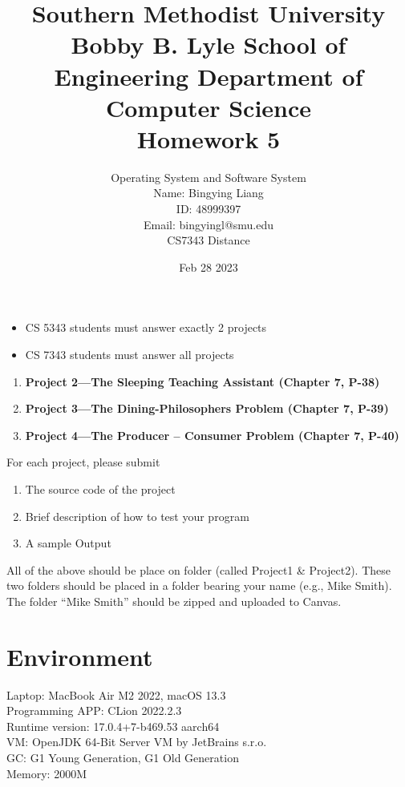 \documentclass[12pt]{article}
\title{Southern Methodist University \\
Bobby B. Lyle School of Engineering Department of Computer Science \\
Homework 5
}
\author{Operating System and Software System \\
Name: Bingying Liang 
\\ ID: 48999397\\ 
Email: bingyingl@smu.edu \\ 
CS7343 Distance}
\date{Feb 28 2023}
\begin{document}
\maketitle
\begin{itemize}
    \item CS 5343 students must answer exactly 2 projects
    \item CS 7343 students must answer all projects
\end{itemize}
    \begin{enumerate}
        \item \textbf{Project 2—The Sleeping Teaching Assistant (Chapter 7, P-38)}
        \item \textbf{Project 3—The Dining-Philosophers Problem (Chapter 7, P-39) }
        \item \textbf{Project 4—The Producer – Consumer Problem (Chapter 7, P-40)}
    \end{enumerate}
    For each project, please submit 
    \begin{enumerate}
        \item The source code of the project
        \item Brief description of how to test your program
        \item A sample Output
    \end{enumerate}
    All of the above should be place on folder (called Project1 \& Project2). These two folders should be placed in a folder bearing your name (e.g., Mike Smith). The folder “Mike Smith” should be zipped and uploaded to Canvas. 
    
    \newpage
    \section*{Environment}
    Laptop: MacBook Air M2 2022, macOS 13.3\\
    
    Programming APP: CLion 2022.2.3 \\
    
    Runtime version: 17.0.4+7-b469.53 aarch64\\
    
    VM: OpenJDK 64-Bit Server VM by JetBrains s.r.o.\\
    
    GC: G1 Young Generation, G1 Old Generation\\
    
    Memory: 2000M\\
    
\end{document}
